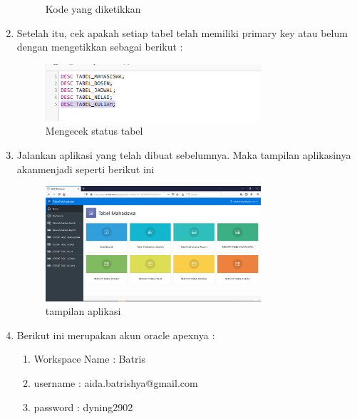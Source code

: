 \begin{enumerate}
\begin{figure}[H]
				\centering
				\caption{Kode yang diketikkan}
				\end{figure}
	\item Setelah itu, cek apakah setiap tabel telah memiliki primary key atau belum dengan mengetikkan sebagai berikut :\\
                \begin{figure}[H]	\includegraphics[width=8cm]{figures/kode2.PNG}
				\centering
				\caption{Mengecek status tabel}
				\end{figure}
	\item Jalankan aplikasi yang telah dibuat sebelumnya. Maka tampilan aplikasinya akanmenjadi seperti berikut ini
				\begin{figure}[H]
				\includegraphics[width=8cm]{figures/aplikasi.png}
				\centering
				\caption{tampilan aplikasi}
				\end{figure}
	\item Berikut ini merupakan akun oracle apexnya :
	\begin{enumerate}
	    \item Workspace Name : Batris
	    \item username : aida.batrishya@gmail.com
	    \item password : dyning2902
	\end{enumerate}
\end{enumerate}
